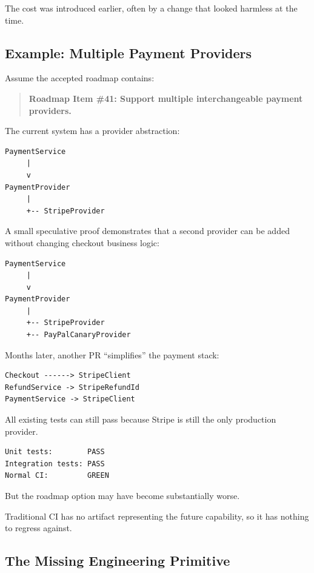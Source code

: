 \documentclass[12pt]{article}
\begin{document}
The cost was introduced earlier, often by a change that looked harmless at the time.

\subsection{Example: Multiple Payment Providers}

Assume the accepted roadmap contains:

\begin{quote}
\textbf{Roadmap Item \#41: Support multiple interchangeable payment providers.}
\end{quote}

The current system has a provider abstraction:

\begin{lstlisting}
PaymentService
     |
     v
PaymentProvider
     |
     +-- StripeProvider
\end{lstlisting}

A small speculative proof demonstrates that a second provider can be added without changing checkout business logic:

\begin{lstlisting}
PaymentService
     |
     v
PaymentProvider
     |
     +-- StripeProvider
     +-- PayPalCanaryProvider
\end{lstlisting}

Months later, another PR ``simplifies'' the payment stack:

\begin{lstlisting}
Checkout ------> StripeClient
RefundService -> StripeRefundId
PaymentService -> StripeClient
\end{lstlisting}

All existing tests can still pass because Stripe is still the only production provider.

\begin{lstlisting}
Unit tests:        PASS
Integration tests: PASS
Normal CI:         GREEN
\end{lstlisting}

But the roadmap option may have become substantially worse.

Traditional CI has no artifact representing the future capability, so it has nothing to regress against.

\subsection{The Missing Engineering Primitive}
\end{document}
